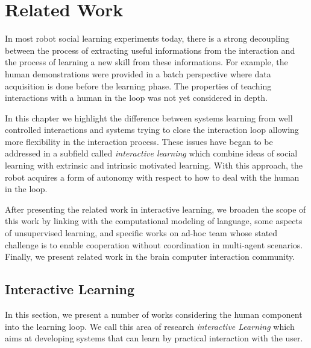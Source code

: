 
\chapter{Related Work}
\label{chapter:relatedwork}
\minitoc


In most robot social learning experiments today, there is a strong decoupling between the process of extracting useful informations from the interaction and the process of learning a new skill from these informations. For example, the human demonstrations were provided in a batch perspective where data acquisition is done before the learning phase. The properties of teaching interactions with a human in the loop was not yet considered in depth.

In this chapter we highlight the difference between systems learning from well controlled interactions and systems trying to close the interaction loop allowing more flexibility in the interaction process. These issues have began to be addressed in a subfield called \emph{interactive learning}  which combine ideas of social learning with extrinsic and intrinsic motivated learning. With this approach, the robot acquires a form of autonomy with respect to how to deal with the human in the loop. 

After presenting the related work in interactive learning, we broaden the scope of this work by linking with the computational modeling of language, some aspects of unsupervised learning, and specific works on ad-hoc team whose stated challenge is to enable cooperation without coordination in multi-agent scenarios. Finally, we present related work in the brain computer interaction community.

\section{Interactive Learning}

In this section, we present a number of works considering the human component into the learning loop. We call this area of research \emph{interactive Learning} \cite{nicolescu2003natural,breazeal2004tutelage} which aims at developing systems that can learn by practical interaction with the user. 

